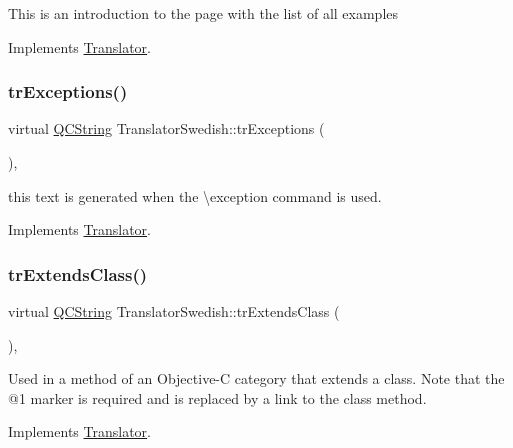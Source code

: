 This is an introduction to the page with the list of all examples 

Implements \mbox{\hyperlink{class_translator}{Translator}}.

\mbox{\label{class_translator_swedish_a6808c075f8f4ffa54e97b2c2bf687eb6}} 
\subsubsection{\texorpdfstring{trExceptions()}{trExceptions()}}
{\footnotesize\ttfamily virtual \mbox{\hyperlink{class_q_c_string}{Q\+C\+String}} Translator\+Swedish\+::tr\+Exceptions (\begin{DoxyParamCaption}{ }\end{DoxyParamCaption})\hspace{0.3cm}{\ttfamily [inline]}, {\ttfamily [virtual]}}

this text is generated when the \textbackslash{}exception command is used. 

Implements \mbox{\hyperlink{class_translator}{Translator}}.

\mbox{\label{class_translator_swedish_aee6a23d339a8af06713ea838015d06a5}} 
\subsubsection{\texorpdfstring{trExtendsClass()}{trExtendsClass()}}
{\footnotesize\ttfamily virtual \mbox{\hyperlink{class_q_c_string}{Q\+C\+String}} Translator\+Swedish\+::tr\+Extends\+Class (\begin{DoxyParamCaption}{ }\end{DoxyParamCaption})\hspace{0.3cm}{\ttfamily [inline]}, {\ttfamily [virtual]}}

Used in a method of an Objective-\/C category that extends a class. Note that the @1 marker is required and is replaced by a link to the class method. 

Implements \mbox{\hyperlink{class_translator}{Translator}}.

\mbox{\label{class_translator_swedish_a48cec8611a80fa170571479b15ba0d4e}} 
